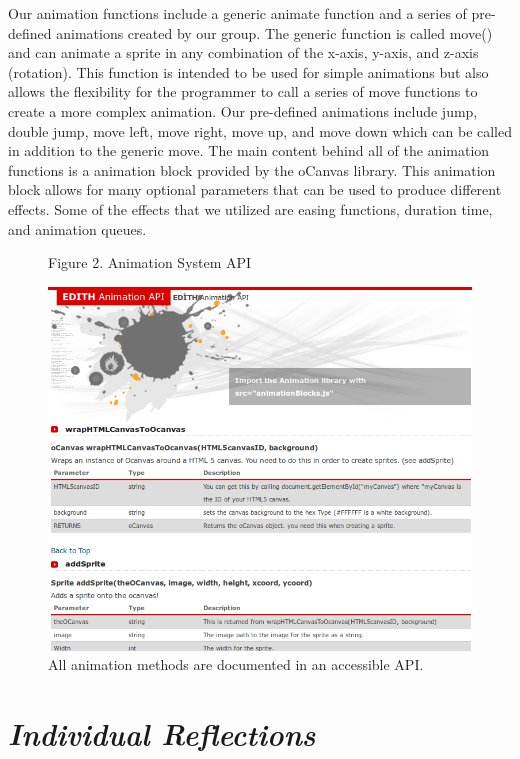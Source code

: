 \documentclass[12pt]{article}
\begin{document}
 \newpage
Our animation functions include a generic animate function and a series of pre-defined animations created by our group. The generic function is called move() and can animate a sprite in any combination of the x-axis, y-axis, and z-axis (rotation). This function is intended to be used for simple animations but also allows the flexibility for the programmer to call a series of move functions to create a more complex animation. Our pre-defined animations include jump, double jump, move left, move right, move up, and move down which can be called in addition to the generic move. The main content behind all of the animation functions is a animation block provided by the oCanvas library. This animation block allows for many optional parameters that can be used to produce different effects. Some of the effects that we utilized are easing functions, duration time, and animation queues. \\ 


\begin{figure}
\caption{Figure 2. Animation System API}
  \centering
    \includegraphics[scale=.3]{api-screenshot.png}
    \caption*{All animation methods are documented in an accessible API.}
\end{figure}
\section{\emph{Individual Reflections}}
\end{document}
